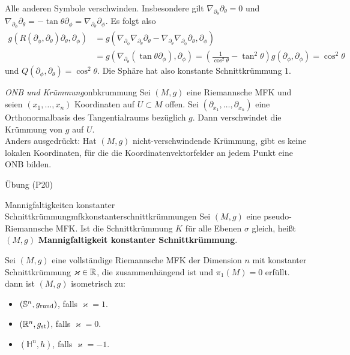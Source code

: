 \begin{beispiele}
\begin{enumerate}
Alle anderen Symbole verschwinden. Insbesondere gilt $\nabla_{\partial_\theta}\partial_\theta=0$ und $\nabla_{\partial_\phi}\partial_\theta=-\tan \theta \partial_\phi = \nabla_{\partial_\theta} \partial_\phi$.
Es folgt also
\begin{align}
g(R(\partial_\phi, \partial_\theta)\partial_\theta, \partial_\phi) &= g(\nabla_{\partial_\phi}\nabla_{\partial_\theta}\partial_\theta - \nabla_{\partial_\theta}\nabla_{\partial_\phi} \partial_\theta, \partial_\phi)\\
&= g(\nabla_{\partial_\theta}(\tan \theta \partial_\phi), \partial_\phi) = \left(\frac{1}{\cos^2 \theta} - \tan^2 \theta \right) g(\partial_\phi, \partial_\phi) = \cos^2 \theta
\end{align}
und $Q(\partial_\phi, \partial_\theta)=\cos^2 \theta$. Die Sphäre hat also konstante Schnittkrümmung $1$.
\end{enumerate}
\end{beispiele}
\begin{satz}{\textit{ONB und Krümmung}}{onbkrummung}
Sei $(M,g)$ eine Riemannsche MFK und seien $(x_1, \dots, x_n)$ Koordinaten auf $U \subset M$ offen. Sei $(\partial_{x_1}, \dots, \partial_{x_n})$ eine Orthonormalbasis des Tangentialraums bezüglich $g$. Dann verschwindet die Krümmung von $g$ auf $U$.\\
Anders ausgedrückt: Hat $(M,g)$ nicht-verschwindende Krümmung, gibt es keine lokalen Koordinaten, für die die Koordinatenvektorfelder an jedem Punkt eine ONB bilden.
\end{satz}
\begin{beweis}
Übung (P20)
\end{beweis}
\begin{definition}{Mannigfaltigkeiten konstanter Schnittkrümmung}{mfkkonstanterschnittkrümmungen}
Sei $(M,g)$ eine pseudo-Riemannsche MFK. Ist die Schnittkrümmung $K$ für alle Ebenen $\sigma$ gleich, heißt $(M,g)$ \textbf{Mannigfaltigkeit konstanter Schnittkrümmung}.
\end{definition}
\begin{satz}{}{}
Sei $(M,g)$ eine vollständige Riemannsche MFK der Dimension $n$ mit konstanter Schnittkrümmung $\varkappa \in \mathbb{R}$, die zusammenhängend ist und $\pi_1(M)=0$ erfüllt. dann ist $(M,g)$ isometrisch zu:
\begin{itemize}
\item $(\mathbb{S}^n, g_\text{rund})$, falls $\varkappa=1$.
\item $(\mathbb{R}^n, g_\text{st})$, falls $\varkappa=0$.
\item $(\mathbb{H}^n, h)$, falls $\varkappa=-1$.
\end{itemize}
\end{satz}
